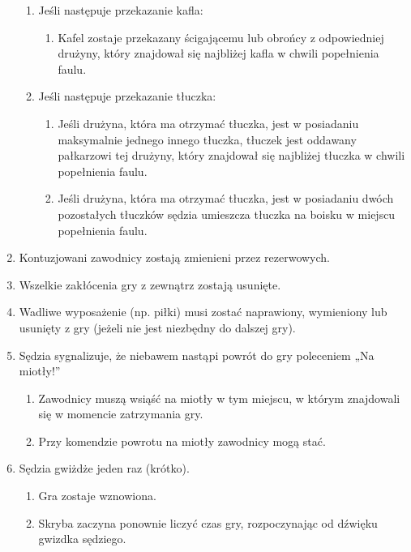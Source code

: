 \documentclass[12pt]{article}
\begin{document}
\begin{enumerate}
	      \begin{enumerate}
		      \item
		            Jeśli następuje przekazanie kafla:

		            \begin{enumerate}
			            \item
			                  Kafel zostaje przekazany ścigającemu lub obrońcy z odpowiedniej
			                  drużyny, który znajdował się najbliżej kafla w chwili popełnienia
			                  faulu.
		            \end{enumerate}
		      \item
		            Jeśli następuje przekazanie tłuczka:

		            \begin{enumerate}
			            \item
			                  Jeśli drużyna, która ma otrzymać tłuczka, jest w posiadaniu
			                  maksymalnie jednego innego tłuczka, tłuczek jest oddawany
			                  pałkarzowi tej drużyny, który znajdował się najbliżej tłuczka w
			                  chwili popełnienia faulu.
			            \item
			                  Jeśli drużyna, która ma otrzymać tłuczka, jest w posiadaniu dwóch
			                  pozostałych tłuczków sędzia umieszcza tłuczka na boisku w miejscu
			                  popełnienia faulu.
		            \end{enumerate}
	      \end{enumerate}
	\item
	      Kontuzjowani zawodnicy zostają zmienieni przez rezerwowych.
	\item
	      Wszelkie zakłócenia gry z zewnątrz zostają usunięte.
	\item
	      Wadliwe wyposażenie (np. piłki) musi zostać naprawiony, wymieniony lub
	      usunięty z gry (jeżeli nie jest niezbędny do dalszej gry).
	\item
	      Sędzia sygnalizuje, że niebawem nastąpi powrót do gry poleceniem „Na
	      miotły!''

	      \begin{enumerate}
		      \item
		            Zawodnicy muszą wsiąść na miotły w tym miejscu, w którym znajdowali
		            się w momencie zatrzymania gry.
		      \item
		            Przy komendzie powrotu na miotły zawodnicy mogą stać.
	      \end{enumerate}
	\item
	      Sędzia gwiżdże jeden raz (krótko).

	      \begin{enumerate}
		      \item
		            Gra zostaje wznowiona.
		      \item
		            Skryba zaczyna ponownie liczyć czas gry, rozpoczynając od dźwięku
		            gwizdka sędziego.
	      \end{enumerate}
\end{enumerate}
\end{document}
